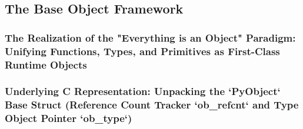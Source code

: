 \subsection{The Base Object Framework}
\subsubsection{The Realization of the "Everything is an Object" Paradigm: Unifying Functions, Types, and Primitives as First-Class Runtime Objects}
\subsubsection{Underlying C Representation: Unpacking the `PyObject` Base Struct (Reference Count Tracker `ob_refcnt` and Type Object Pointer `ob_type`)}
